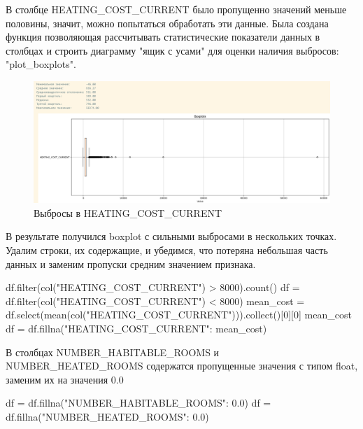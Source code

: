 \par В столбце HEATING\_COST\_CURRENT было пропущенно значений меньше половины, значит, можно попытаться обработать эти данные. Была создана функция позволяющая рассчитывать статистические показатели данных в столбцах и строить диаграмму "ящик с усами" для оценки наличия выбросов: "plot\_boxplots".
\begin{figure}
    \centering
    \includegraphics[width=\textwidth]{Content/Images/vibroses.png}
    \caption{Выбросы в HEATING\_COST\_CURRENT}
    \label{fig:VHCC}
\end{figure}
В результате получился boxplot с сильными выбросами в нескольких точках. Удалим строки, их содержащие, и убедимся, что потеряна небольшая часть данных и заменим пропуски средним значением признака.
\begin{code}
df.filter(col("HEATING\_COST\_CURRENT") > 8000).count()
df = df.filter(col("HEATING\_COST\_CURRENT") < 8000)
mean\_cost = df.select(mean(col("HEATING\_COST\_CURRENT"))).collect()[0][0]
mean\_cost
df = df.fillna({"HEATING\_COST\_CURRENT": mean\_cost})
\end{code}

\par В столбцах NUMBER\_HABITABLE\_ROOMS и NUMBER\_HEATED\_ROOMS содержатся пропущенные значения с типом float, заменим их на значения 0.0

\begin{code}
df = df.fillna({"NUMBER\_HABITABLE\_ROOMS": 0.0})
df = df.fillna({"NUMBER\_HEATED\_ROOMS": 0.0})
\end{code}




